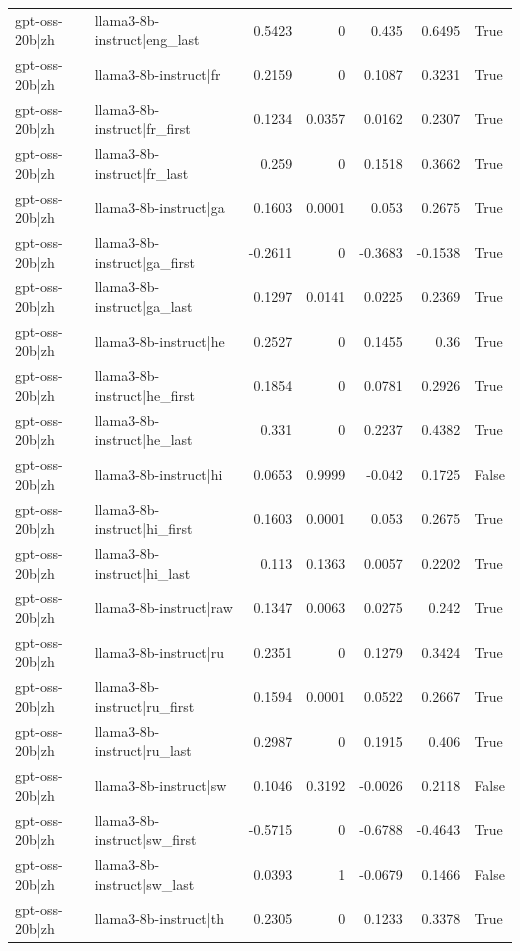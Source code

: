\begin{table}
\begin{tabular}{l l r r r r l}
gpt-oss-20b|zh & llama3-8b-instruct|eng_last & 0.5423 & 0 & 0.435 & 0.6495 & True \\
gpt-oss-20b|zh & llama3-8b-instruct|fr & 0.2159 & 0 & 0.1087 & 0.3231 & True \\
gpt-oss-20b|zh & llama3-8b-instruct|fr_first & 0.1234 & 0.0357 & 0.0162 & 0.2307 & True \\
gpt-oss-20b|zh & llama3-8b-instruct|fr_last & 0.259 & 0 & 0.1518 & 0.3662 & True \\
gpt-oss-20b|zh & llama3-8b-instruct|ga & 0.1603 & 0.0001 & 0.053 & 0.2675 & True \\
gpt-oss-20b|zh & llama3-8b-instruct|ga_first & -0.2611 & 0 & -0.3683 & -0.1538 & True \\
gpt-oss-20b|zh & llama3-8b-instruct|ga_last & 0.1297 & 0.0141 & 0.0225 & 0.2369 & True \\
gpt-oss-20b|zh & llama3-8b-instruct|he & 0.2527 & 0 & 0.1455 & 0.36 & True \\
gpt-oss-20b|zh & llama3-8b-instruct|he_first & 0.1854 & 0 & 0.0781 & 0.2926 & True \\
gpt-oss-20b|zh & llama3-8b-instruct|he_last & 0.331 & 0 & 0.2237 & 0.4382 & True \\
gpt-oss-20b|zh & llama3-8b-instruct|hi & 0.0653 & 0.9999 & -0.042 & 0.1725 & False \\
gpt-oss-20b|zh & llama3-8b-instruct|hi_first & 0.1603 & 0.0001 & 0.053 & 0.2675 & True \\
gpt-oss-20b|zh & llama3-8b-instruct|hi_last & 0.113 & 0.1363 & 0.0057 & 0.2202 & True \\
gpt-oss-20b|zh & llama3-8b-instruct|raw & 0.1347 & 0.0063 & 0.0275 & 0.242 & True \\
gpt-oss-20b|zh & llama3-8b-instruct|ru & 0.2351 & 0 & 0.1279 & 0.3424 & True \\
gpt-oss-20b|zh & llama3-8b-instruct|ru_first & 0.1594 & 0.0001 & 0.0522 & 0.2667 & True \\
gpt-oss-20b|zh & llama3-8b-instruct|ru_last & 0.2987 & 0 & 0.1915 & 0.406 & True \\
gpt-oss-20b|zh & llama3-8b-instruct|sw & 0.1046 & 0.3192 & -0.0026 & 0.2118 & False \\
gpt-oss-20b|zh & llama3-8b-instruct|sw_first & -0.5715 & 0 & -0.6788 & -0.4643 & True \\
gpt-oss-20b|zh & llama3-8b-instruct|sw_last & 0.0393 & 1 & -0.0679 & 0.1466 & False \\
gpt-oss-20b|zh & llama3-8b-instruct|th & 0.2305 & 0 & 0.1233 & 0.3378 & True \\

\end{tabular}
\end{table}
